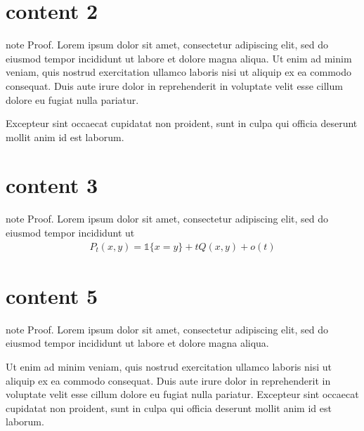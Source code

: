 \chapter{content 2}
\label{\detokenize{proof/_proof_no_classname:content-2}}\label{\detokenize{proof/_proof_no_classname::doc}}
\begin{sphinxadmonition}{note}
\sphinxAtStartPar
Proof. Lorem ipsum dolor sit amet, consectetur adipiscing elit, sed do eiusmod tempor incididunt ut labore et dolore magna aliqua.
Ut enim ad minim veniam, quis nostrud exercitation ullamco laboris nisi ut aliquip ex ea commodo consequat. Duis aute irure dolor in reprehenderit in voluptate velit esse cillum dolore eu fugiat nulla pariatur.

\sphinxAtStartPar
Excepteur sint occaecat cupidatat non proident, sunt in culpa qui officia deserunt mollit anim id est laborum.
\end{sphinxadmonition}


\chapter{content 3}
\label{\detokenize{proof/_proof_with_unlabeled_math:content-3}}\label{\detokenize{proof/_proof_with_unlabeled_math::doc}}
\begin{sphinxadmonition}{note}
\sphinxAtStartPar
Proof. Lorem ipsum dolor sit amet, consectetur adipiscing elit, sed do eiusmod tempor incididunt ut
\begin{equation*}
\begin{split}P_t(x, y) = \mathbb 1\{x = y\} + t Q(x, y) + o(t)\end{split}
\end{equation*}\end{sphinxadmonition}


\chapter{content 5}
\label{\detokenize{proof/_proof_with_argument_content:content-5}}\label{\detokenize{proof/_proof_with_argument_content::doc}}
\begin{sphinxadmonition}{note}
\sphinxAtStartPar
Proof. Lorem ipsum dolor sit amet, consectetur adipiscing elit, sed do eiusmod tempor incididunt ut labore et dolore magna aliqua.

\sphinxAtStartPar
Ut enim ad minim veniam, quis nostrud exercitation ullamco laboris nisi ut aliquip ex ea commodo consequat.
Duis aute irure dolor in reprehenderit in voluptate velit esse cillum dolore eu fugiat nulla pariatur. Excepteur sint occaecat cupidatat non proident, sunt in culpa qui officia deserunt mollit anim id est laborum.
\end{sphinxadmonition}


